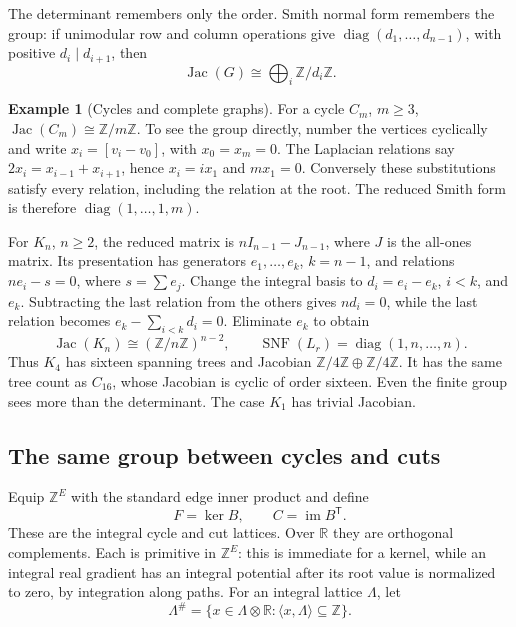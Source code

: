 \documentclass[11pt]{article}
\theoremstyle{definition}
\newtheorem{example}[theorem]{Example}
\theoremstyle{remark}
\newcommand{\Z}{\mathbb Z}
\newcommand{\R}{\mathbb R}
\begin{document}
The determinant remembers only the order.  Smith normal form remembers
the group: if unimodular row and column operations give
\(\operatorname{diag}(d_1,\ldots,d_{n-1})\), with positive
\(d_i\mid d_{i+1}\), then
\[
 \operatorname{Jac}(G)\cong\bigoplus_i\Z/d_i\Z.
\]

\begin{example}[Cycles and complete graphs]
For a cycle \(C_m\), \(m\ge3\),
\(\operatorname{Jac}(C_m)\cong\Z/m\Z\).  To see the group directly,
number the vertices cyclically and write \(x_i=[v_i-v_0]\), with
\(x_0=x_m=0\).  The Laplacian relations say
\(2x_i=x_{i-1}+x_{i+1}\), hence \(x_i=ix_1\) and \(mx_1=0\).
Conversely these substitutions satisfy every relation, including the
relation at the root.  The reduced Smith form is therefore
\(\operatorname{diag}(1,\ldots,1,m)\).

For \(K_n\), \(n\ge2\), the reduced matrix is
\(nI_{n-1}-J_{n-1}\), where \(J\) is the all-ones matrix.  Its
presentation has generators \(e_1,\ldots,e_k\), \(k=n-1\), and relations
\(ne_i-s=0\), where \(s=\sum e_j\).  Change the integral basis to
\(d_i=e_i-e_k\), \(i<k\), and \(e_k\).  Subtracting the last relation
from the others gives \(nd_i=0\), while the last relation becomes
\(e_k-\sum_{i<k}d_i=0\).  Eliminate \(e_k\) to obtain
\[
 \operatorname{Jac}(K_n)\cong(\Z/n\Z)^{n-2},
 \qquad \operatorname{SNF}(L_r)=\operatorname{diag}(1,n,\ldots,n).
\]
Thus \(K_4\) has sixteen spanning trees and Jacobian
\(\Z/4\Z\oplus\Z/4\Z\).  It has the same tree count as \(C_{16}\),
whose Jacobian is cyclic of order sixteen.  Even the finite group sees
more than the determinant.  The case \(K_1\) has trivial Jacobian.
\end{example}

\subsection{The same group between cycles and cuts}

Equip \(\Z^E\) with the standard edge inner product and define
\[
 F=\ker B,\qquad C=\operatorname{im}B^{\mathsf T}.
\]
These are the integral cycle and cut lattices.  Over \(\R\) they are
orthogonal complements.  Each is primitive in \(\Z^E\): this is immediate
for a kernel, while an integral real gradient has an integral potential
after its root value is normalized to zero, by integration along paths.
For an integral lattice \(\Lambda\), let
\[
 \Lambda^\#=\{x\in\Lambda\otimes\R:
                 \langle x,\Lambda\rangle\subseteq\Z\}.
\]
\end{document}
